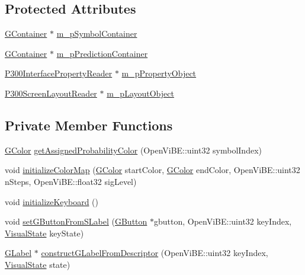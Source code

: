\subsection*{Protected Attributes}
\begin{DoxyCompactItemize}
\item 
\hyperlink{classOpenViBEApplications_1_1GContainer}{GContainer} $\ast$ \hyperlink{classOpenViBEApplications_1_1P300KeyboardHandler_a22390cd11cae7a74d0d22a52edb4f32c}{m\_\-pSymbolContainer}
\item 
\hyperlink{classOpenViBEApplications_1_1GContainer}{GContainer} $\ast$ \hyperlink{classOpenViBEApplications_1_1P300KeyboardHandler_aaa8dbe9e453a27bb6741a57be97e9110}{m\_\-pPredictionContainer}
\item 
\hyperlink{classOpenViBEApplications_1_1P300InterfacePropertyReader}{P300InterfacePropertyReader} $\ast$ \hyperlink{classOpenViBEApplications_1_1P300KeyboardHandler_a957c021c16780736cf2e175cdebc1f5a}{m\_\-pPropertyObject}
\item 
\hyperlink{classOpenViBEApplications_1_1P300ScreenLayoutReader}{P300ScreenLayoutReader} $\ast$ \hyperlink{classOpenViBEApplications_1_1P300KeyboardHandler_a1fd87979441e2834eef9f3f363f49561}{m\_\-pLayoutObject}
\end{DoxyCompactItemize}
\subsection*{Private Member Functions}
\begin{DoxyCompactItemize}
\item 
\hyperlink{structOpenViBEApplications_1_1GColor}{GColor} \hyperlink{classOpenViBEApplications_1_1P300KeyboardHandler_a8d88c72733593905d3a94a2e156e3d68}{getAssignedProbabilityColor} (OpenViBE::uint32 symbolIndex)
\item 
void \hyperlink{classOpenViBEApplications_1_1P300KeyboardHandler_ae5863a522c7a25bfdb457847bfca1d8e}{initializeColorMap} (\hyperlink{structOpenViBEApplications_1_1GColor}{GColor} startColor, \hyperlink{structOpenViBEApplications_1_1GColor}{GColor} endColor, OpenViBE::uint32 nSteps, OpenViBE::float32 sigLevel)
\item 
void \hyperlink{classOpenViBEApplications_1_1P300KeyboardHandler_ae05d96dd9db790b05afb11c18fec508f}{initializeKeyboard} ()
\item 
void \hyperlink{classOpenViBEApplications_1_1P300KeyboardHandler_a333f5d8f22498388e935bb960c572a7f}{setGButtonFromSLabel} (\hyperlink{classOpenViBEApplications_1_1GButton}{GButton} $\ast$gbutton, OpenViBE::uint32 keyIndex, \hyperlink{ova__defines_8h_ac2575a0c79ceb4592555fa66f173dfc8}{VisualState} keyState)
\item 
\hyperlink{classOpenViBEApplications_1_1GLabel}{GLabel} $\ast$ \hyperlink{classOpenViBEApplications_1_1P300KeyboardHandler_a60751010ae5c5533655c10102290d934}{constructGLabelFromDescriptor} (OpenViBE::uint32 keyIndex, \hyperlink{ova__defines_8h_ac2575a0c79ceb4592555fa66f173dfc8}{VisualState} state)
\end{DoxyCompactItemize}
